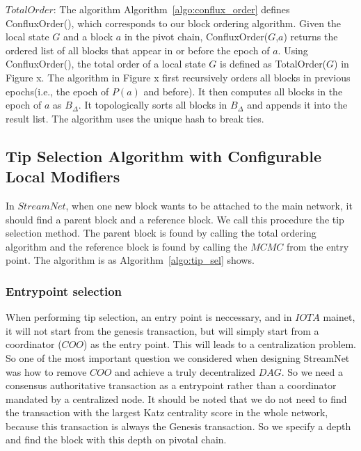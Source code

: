

$Total Order$: The algorithm Algorithm~\ref{algo:conflux_order} defines ConfluxOrder(), which corresponds to our block ordering algorithm. Given the local state $G$ and a block $a$ in the pivot chain, ConfluxOrder($G$,$a$) returns the ordered list of all blocks that appear in or before the epoch of $a$. Using ConfluxOrder(), the total order of a local state $G$ is defined as TotalOrder($G$) in Figure x. The algorithm in Figure x first recursively orders all blocks in previous epochs(i.e., the epoch of $P(a)$ and before). It then computes all blocks in the epoch of $a$ as $B_\Delta$. It topologically sorts all blocks in $B_\Delta$ and appends it into the result list. The algorithm uses the unique hash to break ties. 




\subsection{Tip Selection Algorithm with Configurable Local Modifiers}

In $StreamNet$, when one new block wants to be attached to the main network, it should find a parent block and a reference block. We call this procedure the tip selection method. 
The parent block is found by calling the total ordering algorithm and the reference block is found by calling the $MCMC$ from the entry point. The algorithm is as Algorithm~\ref{algo:tip_sel} shows.



\subsubsection{Entrypoint selection}
When performing tip selection, an entry point is neccessary, and in $IOTA$ mainet, it will not start from the genesis transaction,
but will simply start from a coordinator ($COO$) as the entry point.
This will leads to a centralization problem. 
So one of the most important question we considered when designing StreamNet was how to remove $COO$ and achieve a truly decentralized $DAG$. 
So we need a consensus authoritative transaction as a entrypoint rather than a coordinator mandated by a centralized node.
It should be noted that we do not need to find the transaction with the largest Katz centrality score in the whole network,
because this transaction is always the Genesis transaction.
So we specify a depth and find the block with this depth on pivotal chain.

